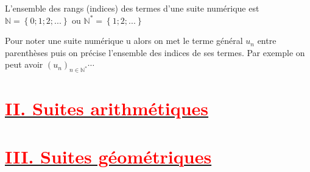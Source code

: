 \documentclass[12pt]{article}
\begin{document}
L’ensemble des rangs (indices) des termes d’une suite numérique est\\
$\mathbb{N}=\left\lbrace 0 ; 1 ; 2 ; ... \right\rbrace$ ou $\mathbb{N}^{*}=\left\lbrace 1 ; 2 ; ... \right\rbrace $

Pour noter une suite numérique u alors on met le terme général $u_{n}$ entre parenthèses puis on précise
l’ensemble des indices de ses termes. Par exemple on peut avoir $(u_{n})_{n\in\mathbb{N}^{*}}\cdots$ 
\section*{\underline{\textbf{\textcolor{red}{II. Suites arithmétiques}}}}
\section*{\underline{\textbf{\textcolor{red}{III. Suites géométriques}}}}
\end{document}
